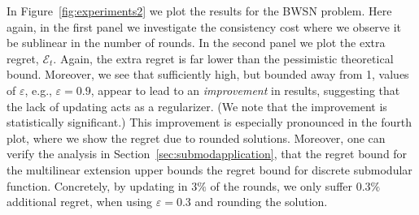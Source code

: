 In Figure~\ref{fig:experiments2} we plot the results for the BWSN problem. Here again, in the first panel we investigate the consistency cost where we observe it be sublinear in the number of rounds. In the second panel we plot the extra regret, $\mathcal{E}_t$. Again, the extra regret is far lower than the pessimistic theoretical bound. Moreover, we see that sufficiently high, but bounded away from 1, values of $\varepsilon$, e.g.,  $\varepsilon = 0.9$, appear to lead to an {\em improvement} in results, suggesting that the lack of updating acts as a regularizer. (We note that the improvement is statistically significant.) This improvement is especially pronounced in the fourth plot, where we show the regret due to rounded solutions. Moreover, one can verify the analysis in Section~\ref{sec:submodapplication}, that the regret bound for the multilinear extension upper bounds the regret bound for discrete submodular function. Concretely, by updating in $3\%$ of the rounds, we only suffer $0.3\%$ additional regret, when using $\varepsilon = 0.3$ and rounding the solution.


